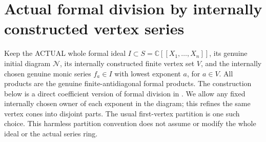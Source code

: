 \section{Actual formal division by internally constructed vertex series}

Keep the ACTUAL whole formal ideal $I\subset S=\mathbb C[[X_1,\ldots,X_n]]$,
its genuine initial diagram $\mathcal N$, its internally constructed finite
vertex set $V$, and the internally chosen genuine monic series $f_a\in I$
with lowest exponent $a$, for $a\in V$. All products are the genuine
finite-antidiagonal formal products. The construction below is a direct
coefficient version of formal division in
\cite[Theorem~3.17, Lemma~7.3, pp.~261--264]{bierstone-milman97-invent-math}.
We allow any fixed internally chosen owner of each exponent in the diagram;
this refines the same vertex cones into disjoint parts. The usual first-vertex
partition is one such choice. This harmless partition convention does not
assume or modify the whole ideal or the actual series ring.


